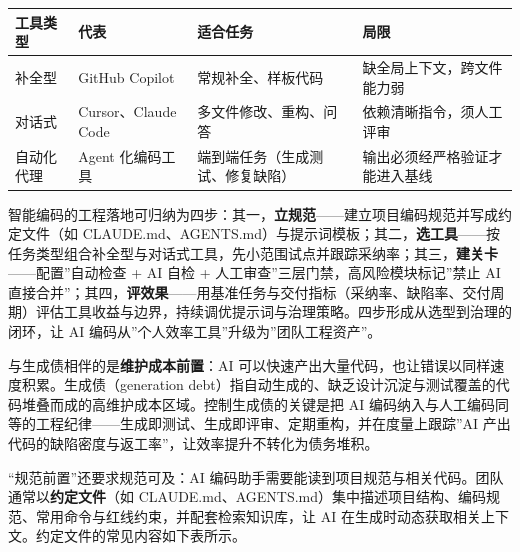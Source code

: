 \documentclass[12pt,a4paper,twoside,openany]{ctexbook}
\numberwithin{figure}{chapter}
\numberwithin{table}{chapter}
\newcounter{none}
\begin{document}
{\def\LTcaptype{none} %
\begin{longtable}[]{@{}
  >{\raggedright\arraybackslash}p{}
  >{\raggedright\arraybackslash}p{}
  >{\raggedright\arraybackslash}p{}
  >{\raggedright\arraybackslash}p{}@{}}
\toprule\noalign{}
\begin{minipage}[b]{\linewidth}\raggedright
工具类型
\end{minipage} & \begin{minipage}[b]{\linewidth}\raggedright
代表
\end{minipage} & \begin{minipage}[b]{\linewidth}\raggedright
适合任务
\end{minipage} & \begin{minipage}[b]{\linewidth}\raggedright
局限
\end{minipage} \\
\midrule\noalign{}
\endhead
\bottomrule\noalign{}
\endlastfoot
补全型 & GitHub Copilot & 常规补全、样板代码 &
缺全局上下文，跨文件能力弱 \\
对话式 & Cursor、Claude Code & 多文件修改、重构、问答 &
依赖清晰指令，须人工评审 \\
自动化代理 & Agent 化编码工具 & 端到端任务（生成测试、修复缺陷） &
输出必须经严格验证才能进入基线 \\
\end{longtable}
}

智能编码的工程落地可归纳为四步：其一，\textbf{立规范}------建立项目编码规范并写成约定文件（如
CLAUDE.md、AGENTS.md）与提示词模板；其二，\textbf{选工具}------按任务类型组合补全型与对话式工具，先小范围试点并跟踪采纳率；其三，\textbf{建关卡}------配置''自动检查
+ AI 自检 + 人工审查''三层门禁，高风险模块标记''禁止 AI
直接合并''；其四，\textbf{评效果}------用基准任务与交付指标（采纳率、缺陷率、交付周期）评估工具收益与边界，持续调优提示词与治理策略。四步形成从选型到治理的闭环，让
AI 编码从''个人效率工具''升级为''团队工程资产''。

与生成债相伴的是\textbf{维护成本前置}：AI
可以快速产出大量代码，也让错误以同样速度积累。生成债（generation
debt）指自动生成的、缺乏设计沉淀与测试覆盖的代码堆叠而成的高维护成本区域。控制生成债的关键是把
AI
编码纳入与人工编码同等的工程纪律------生成即测试、生成即评审、定期重构，并在度量上跟踪''AI
产出代码的缺陷密度与返工率''，让效率提升不转化为债务堆积。

``规范前置''还要求规范可及：AI
编码助手需要能读到项目规范与相关代码。团队通常以\textbf{约定文件}（如
CLAUDE.md、AGENTS.md）集中描述项目结构、编码规范、常用命令与红线约束，并配套检索知识库，让
AI 在生成时动态获取相关上下文。约定文件的常见内容如下表所示。
\end{document}

